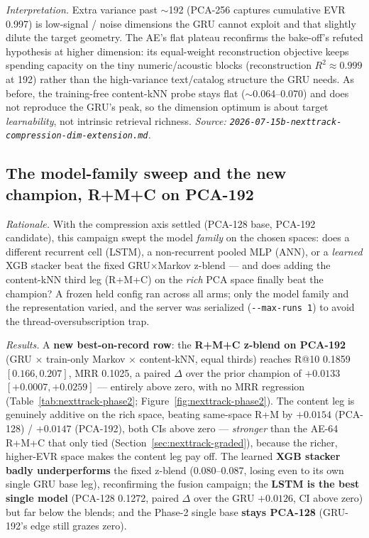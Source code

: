 \documentclass[11pt]{article}
\begin{document}
\emph{Interpretation.} Extra variance past $\sim$192 (PCA-256 captures
cumulative EVR \num{0.997}) is low-signal / noise dimensions the GRU cannot
exploit and that slightly dilute the target geometry. The AE's flat plateau
reconfirms the bake-off's refuted hypothesis at higher dimension: its
equal-weight reconstruction objective keeps spending capacity on the tiny
numeric/acoustic blocks (reconstruction $R^2 \approx 0.999$ at 192) rather than
the high-variance text/catalog structure the GRU needs. As before, the
training-free content-kNN probe stays flat ($\sim$0.064--0.070) and does not
reproduce the GRU's peak, so the dimension optimum is about target
\emph{learnability}, not intrinsic retrieval richness.
\emph{Source: \texttt{2026-07-15b-nexttrack-compression-dim-extension.md}.}

\subsection{The model-family sweep and the new champion, R+M+C on PCA-192}
\label{sec:nexttrack-modelsweep}
\emph{Rationale.} With the compression axis settled (PCA-128 base, PCA-192
candidate), this campaign swept the model \emph{family} on the chosen spaces:
does a different recurrent cell (LSTM), a non-recurrent pooled MLP (ANN), or a
\emph{learned} XGB stacker beat the fixed GRU$\times$Markov z-blend --- and does
adding the content-kNN third leg (R+M+C) on the \emph{rich} PCA space finally
beat the champion? A frozen held config ran across all arms; only the model
family and the representation varied, and the server was serialized
(\texttt{-{}-max-runs 1}) to avoid the thread-oversubscription trap.

\emph{Results.} A \textbf{new best-on-record row}: the \textbf{R+M+C z-blend on
PCA-192} (GRU $\times$ train-only Markov $\times$ content-kNN, equal thirds)
reaches R@10 \num{0.1859} $[0.166, 0.207]$, MRR \num{0.1025}, a paired $\Delta$
over the prior champion of $+\num{0.0133}$ $[+0.0007, +0.0259]$ --- entirely
above zero, with no MRR regression (Table~\ref{tab:nexttrack-phase2};
Figure~\ref{fig:nexttrack-phase2}). The content leg is genuinely additive on the
rich space, beating same-space R+M by $+\num{0.0154}$ (PCA-128) / $+\num{0.0147}$
(PCA-192), both CIs above zero --- \emph{stronger} than the AE-64 R+M+C that
only tied (Section~\ref{sec:nexttrack-graded}), because the richer, higher-EVR
space makes the content leg pay off. The learned \textbf{XGB stacker badly
underperforms} the fixed z-blend (\num{0.080}--\num{0.087}, losing even to its
own single GRU base leg), reconfirming the fusion campaign; the \textbf{LSTM is
the best single model} (PCA-128 \num{0.1272}, paired $\Delta$ over the GRU
$+\num{0.0126}$, CI above zero) but far below the blends; and the Phase-2 single
base \textbf{stays PCA-128} (GRU-192's edge still grazes zero).
\end{document}
